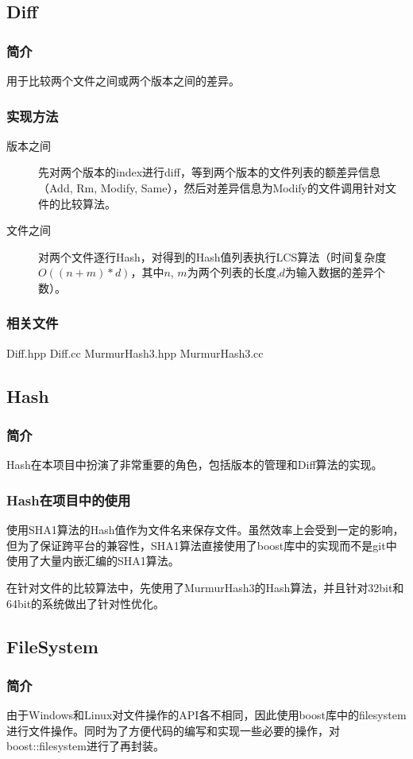 \documentclass[11pt, a4paper, UTF8]{ctexart}
\begin{document}
\subsection{Diff}
\subsubsection{简介}
用于比较两个文件之间或两个版本之间的差异。
\subsubsection{实现方法}
\begin{description}
	\item[版本之间] 先对两个版本的index进行diff，等到两个版本的文件列表的额差异信息（Add, Rm, Modify, Same），然后对差异信息为Modify的文件调用针对文件的比较算法。
	\item[文件之间] 对两个文件逐行Hash，对得到的Hash值列表执行LCS算法（时间复杂度$O((n+m)*d)$，其中$n$, $m$为两个列表的长度,$d$为输入数据的差异个数）。
\end{description}
\subsubsection{相关文件}
Diff.hpp Diff.cc MurmurHash3.hpp MurmurHash3.cc

\subsection{Hash}
\subsubsection{简介}
Hash在本项目中扮演了非常重要的角色，包括版本的管理和Diff算法的实现。
\subsubsection{Hash在项目中的使用}
使用SHA1算法的Hash值作为文件名来保存文件。虽然效率上会受到一定的影响，但为了保证跨平台的兼容性，SHA1算法直接使用了boost库中的实现而不是git中使用了大量内嵌汇编的SHA1算法。

在针对文件的比较算法中，先使用了MurmurHash3的Hash算法，并且针对32bit和64bit的系统做出了针对性优化。

\subsection{FileSystem}
\subsubsection{简介}
由于Windows和Linux对文件操作的API各不相同，因此使用boost库中的filesystem进行文件操作。同时为了方便代码的编写和实现一些必要的操作，对boost::filesystem进行了再封装。
\end{document}
